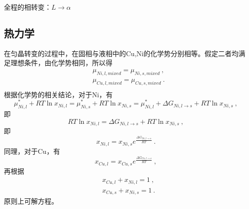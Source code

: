 全程的相转变：$L\to\alpha$

\subsection{热力学}
在匀晶转变的过程中，在固相与液相中的Cu,Ni的化学势分别相等。假定二者均满足理想条件，由化学势相同，所以得
\begin{align}
&\mu_{Ni,l,mixed}=\mu_{Ni,s,mixed}~,\\
&\mu_{Cu,l,mixed}=\mu_{Cu,s,mixed}~.\\
\end{align}
根据化学势的相关结论，对于Ni，有
$$
\mu_{Ni,l}^*+RT \ln x_{Ni,l}=\mu_{Ni,s}^*+RT \ln x_{Ni,s}=\mu_{Ni,l}^*+\Delta G_{Ni, l\rightarrow s} + RT \ln x_{Ni,s}~,
$$
即
$$
RT \ln x_{Ni,l}=\Delta G_{Ni, l\rightarrow s} + RT \ln x_{Ni,s}~,
$$
即
\begin{equation}
x_{Ni,l}=x_{Ni,s}e^{\frac{\Delta G_{Ni, l\rightarrow s}}{RT}}~.
\end{equation}
同理，对于Cu，有
\begin{equation}
x_{Cu,l}=x_{Cu,s}e^{\frac{\Delta G_{Cu, l\rightarrow s}}{RT}}~,
\end{equation}
再根据
\begin{align}
&x_{Cu,l}+x_{Ni,l}=1~,\\
&x_{Cu,s}+x_{Ni,s}=1~.
\end{align}
原则上可解方程。

